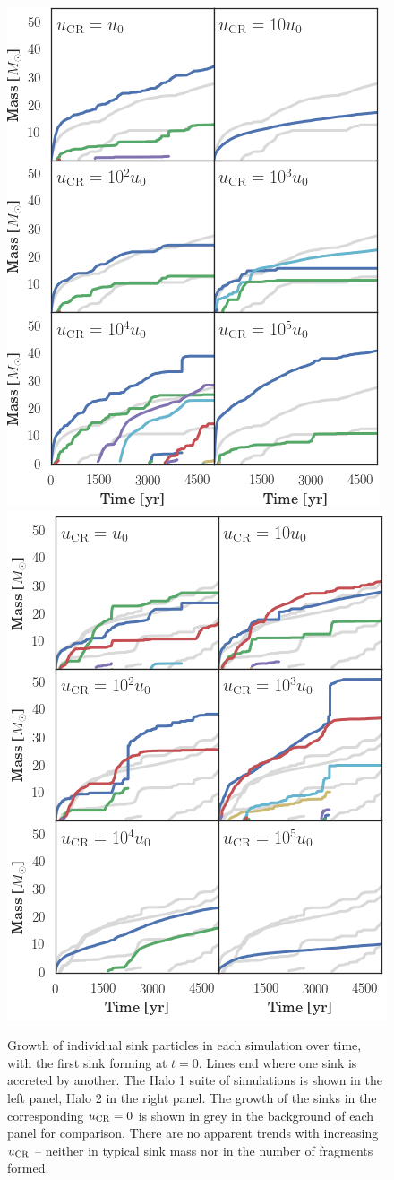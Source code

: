\documentclass[usenatbib]{mn2e}
\newcommand{\ucr}{{u}_{\rm \small CR}}
\begin{document}
\begin{figure}
\begin{center}
\includegraphics[width=.49\textwidth]{figures/sink_masses/sink_masses_halo1}
\includegraphics[width=.49\textwidth]{figures/sink_masses/sink_masses_halo2}
\caption{\label{fig:sinks} 
Growth of individual sink particles in each simulation over time, with the first sink forming at $t=0$. 
Lines end where one sink is accreted by another. 
The Halo 1 suite of simulations is shown in the left panel, Halo 2 in the right panel.  
The growth of the sinks in the corresponding $\ucr=0$ is shown in grey in the background of each panel for comparison. 
There are no apparent trends with increasing $\ucr$ -- neither in typical sink mass nor in the number of fragments formed.%
}
\end{center}
\end{figure}
\end{document}
